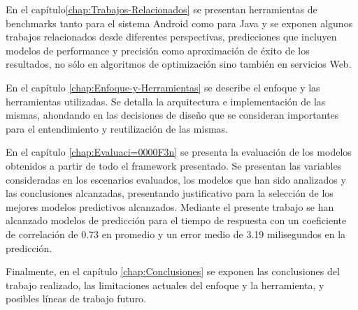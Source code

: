 En el capítulo\ref{chap:Trabajos-Relacionados} se presentan herramientas
de benchmarks tanto para el sistema Android como para Java y se exponen
algunos trabajos relacionados desde diferentes perspectivas, predicciones
que incluyen modelos de performance y precisión como aproximación
de éxito de los resultados, no sólo en algoritmos de optimización
sino también en servicios Web. 

En el capítulo \ref{chap:Enfoque-y-Herramientas} se describe el enfoque
y las herramientas utilizadas. Se detalla la arquitectura e implementación
de las mismas, ahondando en las decisiones de diseño que se consideran
importantes para el entendimiento y reutilización de las mismas. 

En el capítulo \ref{chap:Evaluaci=0000F3n} se presenta la evaluación
de los modelos obtenidos a partir de todo el framework presentado.
Se presentan las variables consideradas en los escenarios evaluados,
los modelos que han sido analizados y las conclusiones alcanzadas,
presentando justificativo para la selección de los mejores modelos
predictivos alcanzados. Mediante el presente trabajo se han alcanzado
modelos de predicción para el tiempo de respuesta con un coeficiente
de correlación de 0.73 en promedio y un error medio de 3.19 milisegundos
en la predicción.

Finalmente, en el capítulo \ref{chap:Conclusiones} se exponen las
conclusiones del trabajo realizado, las limitaciones actuales del
enfoque y la herramienta, y posibles líneas de trabajo futuro.
